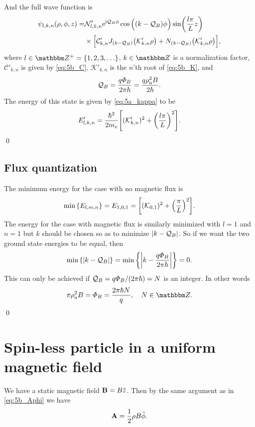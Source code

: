 \documentclass[11pt,letter, swedish, english
]{article}
\begin{document}
And the full wave function is
\begin{equation}
\begin{aligned}
\psi_{l,k,n}(\rho, \phi, z)=&
\mathcal{N}'_{l,k,n}\mathrm{e}^{\mathrm{i}\mathcal{Q}_B\phi}\cos\Big((k-\mathcal{Q}_B)\phi\Big)
\sin(\frac{l\pi}{L}z)\\
&\times
\Big[\mathcal{C}'_{k,n}J_{(k-\mathcal{Q}_B)}\qty(\mathcal{K}'_{k,n}\rho)+
N_{(k-\mathcal{Q}_B)}\qty(\mathcal{K}'_{k,n}\rho) \Big],
\end{aligned}
\end{equation}
where $l\in\Z^+=\{1, 2, 3,\ldots\}$, $k\in\Z$ is a normalization factor, 
$\mathcal{C}'_{k,n}$ is given by \eqref{eq:5b_C}, 
$\mathcal{K}'_{k,n}$ is the $n$'th root of \eqref{eq:5b_K},
and 
\begin{equation}
\mathcal{Q}_B=\frac{q\varPhi_B}{2\pi\hbar}
=\frac{q \rho_a^2 B}{2\hbar}.
\end{equation}
The energy of this state is given by \eqref{eq:5a_kappa} to be
\begin{equation}
E'_{l,k,n}=\frac{\hbar^2}{2m_e}\qty[(\mathcal{K}'_{k,n})^2 + \qty(\frac{l\pi}{L})^2].
\end{equation}
\qed


\subsection{Flux quantization}
The minimum energy for the case with no magnetic flux is
\begin{equation}
\min\qty{E_{l,m,n}}=E_{1,0,1}
=\qty[(\mathcal{K}_{0,1})^2 + \qty(\frac{\pi}{L})^2].
\end{equation}
The energy for the case with magnetic flux is similarly minimized with
$l=1$ and $n=1$ but $k$ should be chosen so as to minimize
$|k-\mathcal{Q}_B|$. So if we want the two ground state energies to be equal,
then
\begin{equation}
\min\qty{\abs{k-\ensuremath{\mathcal{Q}_B}}}
=\min\qty{\abs{k-\frac{q\varPhi_B}{2\pi\hbar}}}=0.
\end{equation}
This can only be achieved if $\mathcal{Q}_B=q\varPhi_B/(2\pi\hbar)=N$ is an
integer. In other words
\begin{equation}
\pi\rho_a^2B=\varPhi_B=\frac{2\pi\hbar N}{q}\qcomma N\in\Z.
\end{equation}
\qed





\section{Spin-less particle in a uniform magnetic field}
We have a static magnetic field $\vb{B}=B\hat{z}$. Then by
the same argument as in \eqref{eq:5b_Aphi} we have
\begin{equation}\label{eq:6_A}
\vb{A}=\frac{1}{2}\rho B\hat{\phi}.
\end{equation}
\end{document}
